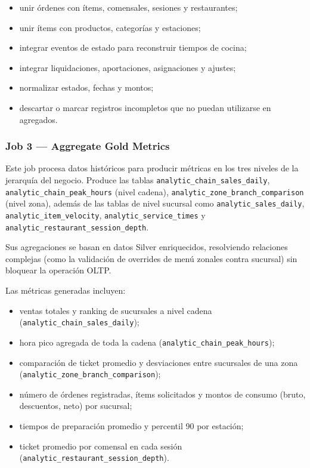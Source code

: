 \begin{itemize}[leftmargin=1.5em]
  \item unir órdenes con ítems, comensales, sesiones y restaurantes;
  \item unir ítems con productos, categorías y estaciones;
  \item integrar eventos de estado para reconstruir tiempos de cocina;
  \item integrar liquidaciones, aportaciones, asignaciones y ajustes;
  \item normalizar estados, fechas y montos;
  \item descartar o marcar registros incompletos que no puedan utilizarse en agregados.
\end{itemize}

\subsubsection{Job 3 --- Aggregate Gold Metrics}

Este job procesa datos históricos para producir métricas en los tres niveles de la jerarquía del negocio. 
Produce las tablas \texttt{analytic\_chain\_sales\_daily}, \texttt{analytic\_chain\_peak\_hours} (nivel cadena),
\texttt{analytic\_zone\_branch\_comparison} (nivel zona), además de las tablas de nivel sucursal como \texttt{analytic\_sales\_daily},
\texttt{analytic\_item\_velocity}, \texttt{analytic\_service\_times} y \texttt{analytic\_restaurant\_session\_depth}.

Sus agregaciones se basan en datos Silver enriquecidos, resolviendo relaciones complejas (como la validación
de overrides de menú zonales contra sucursal) sin bloquear la operación OLTP.

Las métricas generadas incluyen:

\begin{itemize}[leftmargin=1.5em]
  \item ventas totales y ranking de sucursales a nivel cadena (\texttt{analytic\_chain\_sales\_daily});
  \item hora pico agregada de toda la cadena (\texttt{analytic\_chain\_peak\_hours});
  \item comparación de ticket promedio y desviaciones entre sucursales de una zona (\texttt{analytic\_zone\_branch\_comparison});
  \item número de órdenes registradas, ítems solicitados y montos de consumo (bruto, descuentos, neto) por sucursal;
  \item tiempos de preparación promedio y percentil 90 por estación;
  \item ticket promedio por comensal en cada sesión (\texttt{analytic\_restaurant\_session\_depth}).
\end{itemize}

